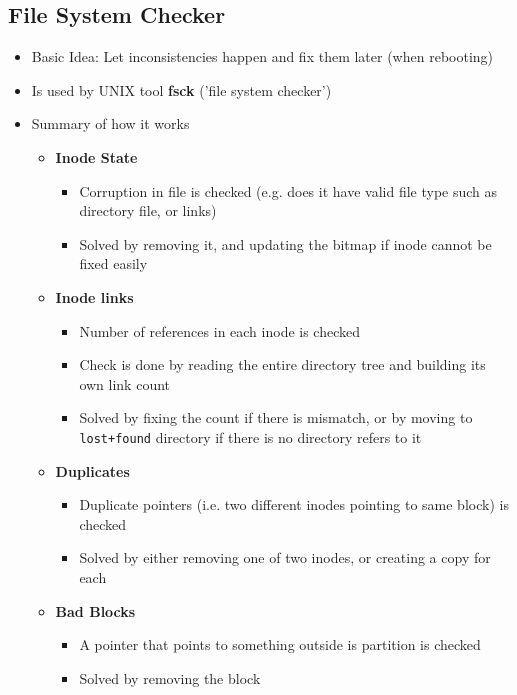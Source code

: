 \documentclass[12pt]{article}
\begin{document}
\subsection{File System Checker}

\begin{itemize}
    \item Basic Idea: Let inconsistencies happen and fix them later (when rebooting)
    \item Is used by UNIX tool \textbf{fsck} ('file system checker')
    \item Summary of how it works

    \begin{itemize}
        \item \textbf{Inode State}
        \begin{itemize}
            \item Corruption in file is checked (e.g. does it have valid file type such as directory file, or links)
            \item Solved by removing it, and updating the bitmap if inode cannot be fixed easily
        \end{itemize}
        \item \textbf{Inode links}
        \begin{itemize}
            \item Number of references in each inode is checked
            \item Check is done by reading the entire directory tree and building its own link count
            \item Solved by fixing the count if there is mismatch, or by moving to \texttt{lost+found}
            directory if there is no directory refers to it
        \end{itemize}
        \item \textbf{Duplicates}
        \begin{itemize}
            \item Duplicate pointers (i.e. two different inodes pointing to same block) is checked
            \item Solved by either removing one of two inodes, or creating a copy for each
        \end{itemize}
        \item \textbf{Bad Blocks}

        \begin{itemize}
            \item A pointer that points to something outside is partition is checked
            \item Solved by removing the block
        \end{itemize}


\end{itemize}
\end{itemize}
\end{document}
